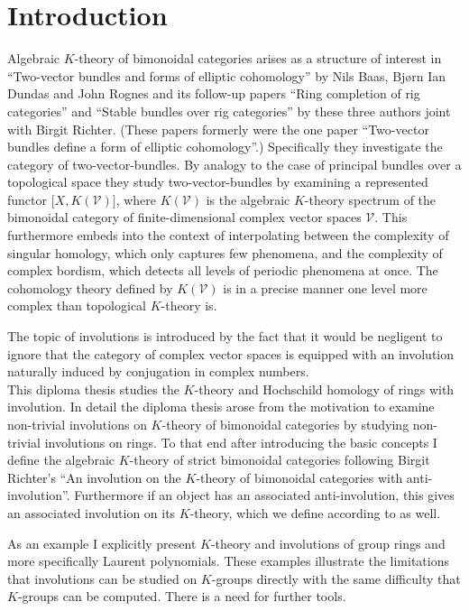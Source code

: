 \chapter*{Introduction}
Algebraic $K$-theory of bimonoidal categories arises as a structure of interest in ``Two-vector bundles and forms of
elliptic cohomology'' \cite{baas2004two} by Nils Baas, Bj\o{}rn Ian Dundas and John Rognes and its follow-up papers
``Ring completion of rig categories'' \cite{baas2009ring} and ``Stable bundles over rig categories''\cite{baas909stable}
by these three authors joint with Birgit Richter. (These papers formerly were the one paper ``Two-vector bundles define a form of elliptic cohomology''.)
Specifically they investigate the category of two-vector-bundles. By analogy to the case of principal bundles
over a topological space they study two-vector-bundles by examining a represented functor $\lbrack X, K(\mathcal{V})\rbrack$, where
$K(\mathcal{V})$ is the algebraic $K$-theory spectrum of the bimonoidal category of finite-dimensional complex vector spaces $\mathcal{V}$.
This furthermore embeds into the context of interpolating between the complexity of singular homology, which only captures few phenomena, and
the complexity of complex bordism, which detects all levels of periodic phenomena at once. The cohomology theory defined by $K(\mathcal{V})$
is in a precise manner one level more complex than topological $K$-theory is.

The topic of involutions is introduced by the fact that it would be negligent to ignore that the category of complex vector spaces
is equipped with an involution naturally induced by conjugation in complex numbers.\\[3ex]

This diploma thesis studies the $K$-theory and Hochschild homology of rings with involution.
In detail the diploma thesis arose from the motivation to examine non-trivial involutions on $K$-theory of bimonoidal categories by studying
non-trivial involutions on rings. To that end after introducing the basic concepts I define the algebraic $K$-theory of
strict bimonoidal categories following Birgit Richter's ``An involution on the $K$-theory of
bimonoidal categories with anti-involution''\cite{richter2010involution}. Furthermore if an object has an associated
anti-involution, this gives an associated involution on its $K$-theory, which we define according to \cite{richter2010involution} as well.

As an example I explicitly present $K$-theory and involutions of group rings and more specifically Laurent polynomials.
These examples illustrate the limitations that involutions can be studied on $K$-groups directly with the same difficulty
that $K$-groups can be computed. There is a need for further tools.\\[1ex]


